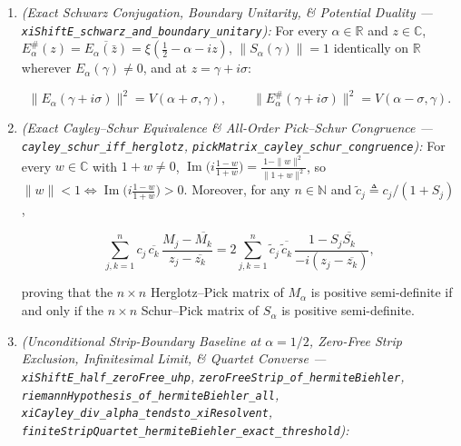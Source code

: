 \documentclass[
  11pt,
]{article}
\begin{document}
\begin{enumerate}
\def\labelenumi{\arabic{enumi}.}
\item
  \emph{(Exact Schwarz Conjugation, Boundary Unitarity, \& Potential
  Duality --- \texttt{xiShiftE\_schwarz\_and\_boundary\_unitary}):} For
  every \(\alpha \in \mathbb{R}\) and \(z \in \mathbb{C}\),
  \(E_\alpha^{\#}(z) = \overline{E_\alpha(\bar{z})} = \xi(\frac{1}{2} - \alpha - iz)\),
  \(\|S_\alpha(\gamma)\| = 1\) identically on \(\mathbb{R}\) wherever
  \(E_\alpha(\gamma) \neq 0\), and at \(z = \gamma + i\sigma\):

  \[\|E_\alpha(\gamma + i\sigma)\|^2 = V(\alpha + \sigma, \gamma), \qquad \|E_\alpha^{\#}(\gamma + i\sigma)\|^2 = V(\alpha - \sigma, \gamma).\]
\item
  \emph{(Exact Cayley--Schur Equivalence \& All-Order Pick--Schur
  Congruence --- \texttt{cayley\_schur\_iff\_herglotz},
  \texttt{pickMatrix\_cayley\_schur\_congruence}):} For every
  \(w \in \mathbb{C}\) with \(1 + w \neq 0\),
  \(\operatorname{Im}\big(i\frac{1 - w}{1 + w}\big) = \frac{1 - \|w\|^2}{\|1 + w\|^2}\),
  so
  \(\|w\| < 1 \iff \operatorname{Im}\big(i\frac{1 - w}{1 + w}\big) > 0\).
  Moreover, for any \(n \in \mathbb{N}\) and
  \(\tilde{c}_j \triangleq c_j / (1 + S_j)\),

  \[\sum_{j,k=1}^n c_j\,\overline{c_k}\,\frac{M_j - \overline{M_k}}{z_j - \overline{z_k}} = 2\sum_{j,k=1}^n \tilde{c}_j\,\overline{\tilde{c}_k}\,\frac{1 - S_j\overline{S_k}}{-i(z_j - \overline{z_k})},\]

  proving that the \(n \times n\) Herglotz--Pick matrix of \(M_\alpha\)
  is positive semi-definite if and only if the \(n \times n\)
  Schur--Pick matrix of \(S_\alpha\) is positive semi-definite.
\item
  \emph{(Unconditional Strip-Boundary Baseline at \(\alpha = 1/2\),
  Zero-Free Strip Exclusion, Infinitesimal Limit, \& Quartet Converse
  --- \texttt{xiShiftE\_half\_zeroFree\_uhp},
  \texttt{zeroFreeStrip\_of\_hermiteBiehler},
  \texttt{riemannHypothesis\_of\_hermiteBiehler\_all},
  \texttt{xiCayley\_div\_alpha\_tendsto\_xiResolvent},
  \texttt{finiteStripQuartet\_hermiteBiehler\_exact\_threshold}):}


\end{enumerate}
\end{document}

